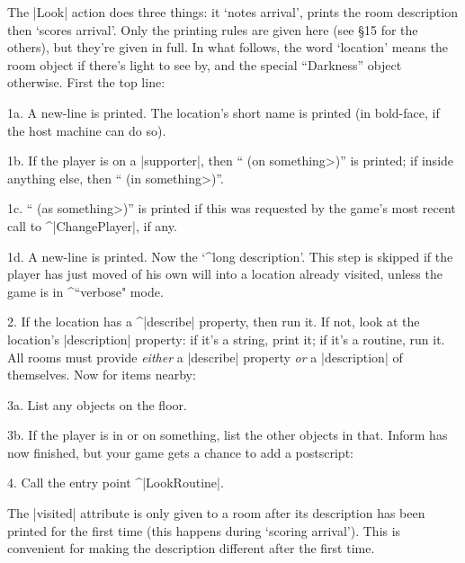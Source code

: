 {{\bigskip\ninepoint
\ddanger The |Look| action does three things: it `notes arrival', prints
the room description then `scores arrival'.  Only the printing rules are given
here (see \S 15 for the others), but they're given in full.  In what follows,
the word `location' means the room object if there's light to see by,
and the special ``Darkness'' object otherwise.  First the top line:
\item{1a.} A new-line is printed.  The location's short name is printed
(in bold-face, if the host machine can do so).
\item{1b.} If the player is on a |supporter|, then
`` (on \<something>)'' is printed; if inside anything else, then
`` (in \<something>)''.
\item{1c.} `` (as \<something>)'' is printed if this was requested by the game's most
recent call to ^|ChangePlayer|, if any.
\item{1d.} A new-line is printed.
\ninepoint%
Now the `^{long description}'.  This step is skipped if the player has just
moved of his own will into a location already visited, unless the game is in ^{``verbose"}
mode.
\item{2.} If the location has a ^|describe| property, then run it.  If not,
look at the location's |description| property: if it's a string, print it;
if it's a routine, run it.
\ninepoint%
All rooms must provide {\sl either} a |describe| property {\sl or} a
|description| of themselves.  Now for items nearby:
\item{3a.} List any objects on the floor.
\item{3b.} If the player is in or on something, list the other
objects in that.
\ninepoint%
Inform has now finished, but your game gets a chance to add a postscript:
\item{4.} Call the entry point ^|LookRoutine|.

\danger The |visited| attribute is only given to a room after its description
has been printed for the first time (this happens during `scoring arrival').
This is convenient for making the description different after the first time.

}}
